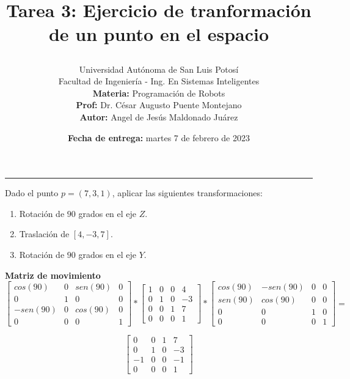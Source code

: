 \documentclass[a4paper, 12pt]{article}
\title{
    \vspace{-3cm}Tarea 3: Ejercicio de tranformación de un punto en
    el espacio
    \author{
        Universidad Autónoma de San Luis Potosí\\
        Facultad de Ingeniería - Ing. En Sistemas Inteligentes\\
        \textbf{Materia:} Programación de Robots\\
        \textbf{Prof:} Dr. César Augusto Puente Montejano\\
        \textbf{Autor:} Angel de Jesús Maldonado Juárez
    }
    \date{\textbf{Fecha de entrega:} martes 7 de febrero de 2023}
}
\begin{document}
\maketitle
\hrule\vspace*{1cm}

Dado el punto \(p=(7,3,1)\), aplicar las siguientes transformaciones:
\begin{enumerate}
    \item Rotación de \(90\) grados en el eje \(Z\).
    \item Traslación de \([4,-3,7]\).
    \item Rotación de \(90\) grados en el eje \(Y\).
\end{enumerate}

\textbf{Matriz de movimiento}
\begin{equation*}
    \begin{bmatrix}
        cos(90)  & 0 & sen(90) & 0 \\
        0        & 1 & 0       & 0 \\
        -sen(90) & 0 & cos(90) & 0 \\
        0        & 0 & 0       & 1
    \end{bmatrix}
    *
    \begin{bmatrix}
        1 & 0 & 0 & 4  \\
        0 & 1 & 0 & -3 \\
        0 & 0 & 1 & 7  \\
        0 & 0 & 0 & 1
    \end{bmatrix}
    *
    \begin{bmatrix}
        cos(90) & -sen(90) & 0 & 0 \\
        sen(90) & cos(90)  & 0 & 0 \\
        0       & 0        & 1 & 0 \\
        0       & 0        & 0 & 1
    \end{bmatrix}
    =
\end{equation*}

\begin{equation*}
    \begin{bmatrix}
        0  & 0 & 1 & 7  \\
        0  & 1 & 0 & -3 \\
        -1 & 0 & 0 & -1 \\
        0  & 0 & 0 & 1
    \end{bmatrix}
\end{equation*}
\end{document}
